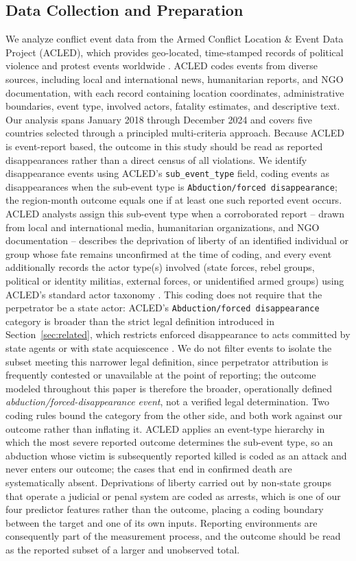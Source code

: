 \documentclass[pdflatex,sn-mathphys-num]{sn-jnl}%
\theoremstyle{thmstyleone}%
\theoremstyle{thmstyletwo}%
\theoremstyle{thmstylethree}%
\begin{document}
\subsection{Data Collection and Preparation}

We analyze conflict event data from the Armed Conflict Location \& Event Data Project (ACLED), which provides geo-located, time-stamped records of political violence and protest events worldwide \cite{raleigh2010acled}. ACLED codes events from diverse sources, including local and international news, humanitarian reports, and NGO documentation, with each record containing location coordinates, administrative boundaries, event type, involved actors, fatality estimates, and descriptive text. Our analysis spans January 2018 through December 2024 and covers five countries selected through a principled multi-criteria approach. Because ACLED is event-report based, the outcome in this study should be read as reported disappearances rather than a direct census of all violations. We identify disappearance events using ACLED's \texttt{sub\_event\_type} field, coding events as disappearances when the sub-event type is \texttt{Abduction/forced disappearance}; the region-month outcome equals one if at least one such reported event occurs. ACLED analysts assign this sub-event type when a corroborated report -- drawn from local and international media, humanitarian organizations, and NGO documentation -- describes the deprivation of liberty of an identified individual or group whose fate remains unconfirmed at the time of coding, and every event additionally records the actor type(s) involved (state forces, rebel groups, political or identity militias, external forces, or unidentified armed groups) using ACLED's standard actor taxonomy \cite{raleigh2010acled}. This coding does not require that the perpetrator be a state actor: ACLED's \texttt{Abduction/forced disappearance} category is broader than the strict legal definition introduced in Section~\ref{sec:related}, which restricts enforced disappearance to acts committed by state agents or with state acquiescence \cite{icpped2006}. We do not filter events to isolate the subset meeting this narrower legal definition, since perpetrator attribution is frequently contested or unavailable at the point of reporting; the outcome modeled throughout this paper is therefore the broader, operationally defined \emph{abduction/forced-disappearance event}, not a verified legal determination. Two coding rules bound the category from the other side, and both work against our outcome rather than inflating it. ACLED applies an event-type hierarchy in which the most severe reported outcome determines the sub-event type, so an abduction whose victim is subsequently reported killed is coded as an attack and never enters our outcome; the cases that end in confirmed death are systematically absent. Deprivations of liberty carried out by non-state groups that operate a judicial or penal system are coded as arrests, which is one of our four predictor features rather than the outcome, placing a coding boundary between the target and one of its own inputs. Reporting environments are consequently part of the measurement process, and the outcome should be read as the reported subset of a larger and unobserved total.
\end{document}
